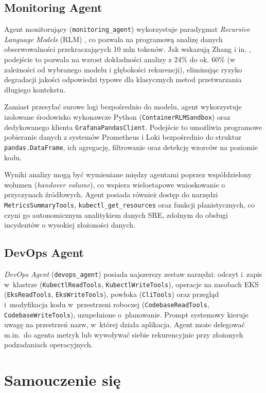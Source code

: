 \subsection{Monitoring Agent}

Agent monitorujący (\texttt{monitoring\_agent}) wykorzystuje paradygmat \textit{Recursive Language Models} (RLM) \cite{rlm}, co pozwala na programową analizę danych obserwowalności przekraczających 10 mln tokenów. Jak wskazują Zhang i in. \cite{rlm}, podejście to pozwala na wzrost dokładności analizy z 24\% do ok. 60\% (w zależności od wybranego modelu i głębokości rekurencji), eliminując ryzyko degradacji jakości odpowiedzi typowe dla klasycznych metod przetwarzania długiego kontekstu.

Zamiast przesyłać surowe logi bezpośrednio do modelu, agent wykorzystuje izolowane środowisko wykonawcze Python (\texttt{ContainerRLMSandbox}) oraz dedykowanego klienta \texttt{GrafanaPandasClient}. Podejście to umożliwia programowe pobieranie danych z systemów Prometheus i Loki bezpośrednio do struktur \texttt{pandas.DataFrame}, ich agregację, filtrowanie oraz detekcję wzorców na poziomie kodu.

Wyniki analizy mogą być wymieniane między agentami poprzez współdzielony wolumen (\textit{handover volume}), co wspiera wieloetapowe wnioskowanie o przyczynach źródłowych. Agent posiada również dostęp do narzędzi \texttt{MetricsSummaryTools}, \texttt{kubectl\_get\_resources} oraz funkcji planistycznych, co czyni go autonomicznym analitykiem danych SRE, zdolnym do obsługi incydentów o wysokiej złożoności danych.

\subsection{DevOps Agent}

\textit{DevOps Agent} (\texttt{devops\_agent}) posiada najszerszy zestaw narzędzi: odczyt i~zapis w~klastrze (\texttt{KubectlReadTools}, \texttt{KubectlWriteTools}), operacje na zasobach EKS (\texttt{EksReadTools}, \texttt{EksWriteTools}), powłoka (\texttt{CliTools}) oraz przegląd i~modyfikacja kodu w~przestrzeni roboczej (\texttt{CodebaseReadTools}, \texttt{CodebaseWriteTools}), uzupełnione o~planowanie. Prompt systemowy kieruje uwagę na przestrzeń nazw, w~której działa aplikacja. Agent może delegować m.in.\ do agenta metryk lub wywoływać siebie rekurencyjnie przy złożonych podzadaniach operacyjnych.

\section{Samouczenie się}

